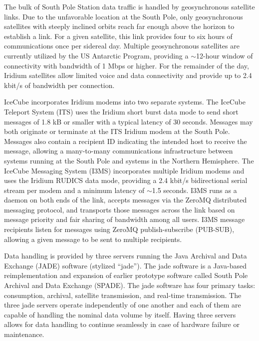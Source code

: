The bulk of South Pole Station data traffic is handled by geosynchronous satellite links.  Due to the unfavorable
location at the South Pole, only geosynchronous satellites with steeply inclined orbits reach far enough above the
horizon to establish a link.  For a given satellite, this link provides four to six hours of communications once per
sidereal day.  Multiple geosynchronous satellites are currently
utilized by the US Antarctic Program, providing a $\sim$12-hour window
of connectivity with bandwidth of 1 Mbps or higher.  For the remainder of the day, Iridium satellites allow
limited voice and data connectivity and provide up to 2.4 kbit/s of bandwidth per connection.

IceCube incorporates Iridium modems into two separate systems.  The IceCube Teleport System (ITS) uses the Iridium short burst
data mode to send short messages of 1.8 kB or smaller with a typical latency of 30 seconds.  Messages may both originate or terminate
at the ITS Iridium modem at the South Pole.  Messages also contain a recipient ID indicating the intended host to receive
the message, allowing a many-to-many communications infrastructure between systems running at the South Pole and systems
in the Northern Hemisphere.  The IceCube Messaging System (I3MS) incorporates multiple Iridium modems and uses the Iridium RUDICS
data mode, providing a 2.4 kbit/s bidirectional serial stream per modem and a minimum latency of $\sim$1.5 seconds.
I3MS runs as a daemon on both ends of the link, accepts messages via
the ZeroMQ  distributed messaging protocol, and transports those messages across the link
based on message priority and fair sharing of bandwidth among all
users. I3MS message recipients listen for messages
using ZeroMQ publish-subscribe (PUB-SUB), allowing a given message to be sent to multiple recipients.


Data handling is provided by three servers running the Java Archival and Data Exchange (JADE) software (stylized “jade”). 
The jade software is a Java-based reimplementation and expansion of earlier prototype software called South Pole Archival
and Data Exchange (SPADE). The jade software has four primary tasks: consumption, archival, satellite transmission, and real-time
transmission. The three jade servers operate independently of one another and
each of them are capable of handling the nominal data volume by itself. Having three servers allows for data handling to continue seamlessly
in case of hardware failure or maintenance.

